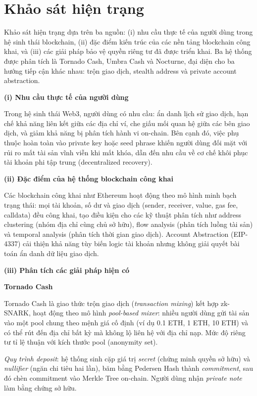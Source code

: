 \documentclass[../DoAn.tex]{subfiles}
\begin{document}
\section{Khảo sát hiện trạng}
\label{section:2.1}

Khảo sát hiện trạng dựa trên ba nguồn: (i) nhu cầu thực tế của người dùng trong hệ sinh thái blockchain, (ii) đặc điểm kiến trúc của các nền tảng blockchain công khai, và (iii) các giải pháp bảo vệ quyền riêng tư đã được triển khai. Ba hệ thống được phân tích là Tornado Cash, Umbra Cash và Nocturne, đại diện cho ba hướng tiếp cận khác nhau: trộn giao dịch, stealth address và private account abstraction.

\textbf{(i) Nhu cầu thực tế của người dùng}

Trong hệ sinh thái Web3, người dùng có nhu cầu: ẩn danh lịch sử giao dịch, hạn chế khả năng liên kết giữa các địa chỉ ví, che giấu mối quan hệ giữa các bên giao dịch, và giảm khả năng bị phân tích hành vi on-chain. Bên cạnh đó, việc phụ thuộc hoàn toàn vào private key hoặc seed phrase khiến người dùng đối mặt với rủi ro mất tài sản vĩnh viễn khi mất khóa, dẫn đến nhu cầu về cơ chế khôi phục tài khoản phi tập trung (decentralized recovery).

\textbf{(ii) Đặc điểm của hệ thống blockchain công khai}

Các blockchain công khai như Ethereum hoạt động theo mô hình minh bạch trạng thái: mọi tài khoản, số dư và giao dịch (sender, receiver, value, gas fee, calldata) đều công khai, tạo điều kiện cho các kỹ thuật phân tích như address clustering (nhóm địa chỉ cùng chủ sở hữu), flow analysis (phân tích luồng tài sản) và temporal analysis (phân tích thời gian giao dịch). Account Abstraction (EIP-4337) cải thiện khả năng tùy biến logic tài khoản nhưng không giải quyết bài toán ẩn danh dữ liệu giao dịch.

\textbf{(iii) Phân tích các giải pháp hiện có}

\textbf{Tornado Cash}

Tornado Cash là giao thức trộn giao dịch (\textit{transaction mixing}) kết hợp zk-SNARK, hoạt động theo mô hình \textit{pool-based mixer}: nhiều người dùng gửi tài sản vào một pool chung theo mệnh giá cố định (ví dụ 0.1 ETH, 1 ETH, 10 ETH) và có thể rút đến địa chỉ bất kỳ mà không lộ liên hệ với địa chỉ nạp. Mức độ riêng tư tỉ lệ thuận với kích thước pool (anonymity set).

\textit{Quy trình deposit}: hệ thống sinh cặp giá trị \textit{secret} (chứng minh quyền sở hữu) và \textit{nullifier} (ngăn chi tiêu hai lần), băm bằng Pedersen Hash thành \textit{commitment}, sau đó chèn commitment vào Merkle Tree on-chain. Người dùng nhận \textit{private note} làm bằng chứng sở hữu.
\end{document}
